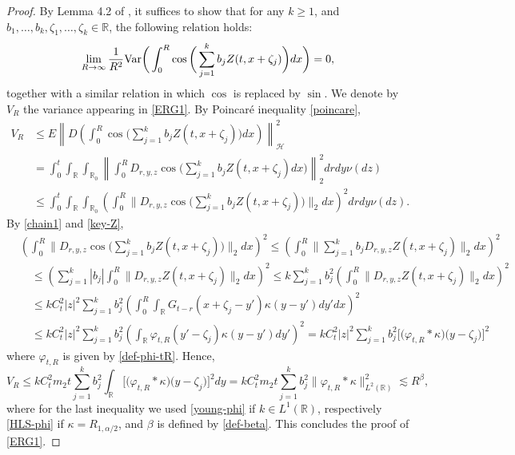 \documentclass[12pt]{article}
\def\cH{\mathcal{H}}
\def\bR{\mathbb{R}}
\newcommand{\les}{\lesssim}
\def\k{\kappa}
\begin{document}
\begin{proof} By Lemma 4.2 of \cite{BZ25}, it suffices to show that for any $k\geq 1$, and $b_1, \ldots , b_k, \zeta_1, \ldots, \zeta_k\in\bR$, the following relation holds:
\begin{align}
\label{ERG1}
\lim_{R\to\infty} \frac{1}{R^{2}}
{\rm Var}\bigg(  \int_0^R  \cos \bigg(\sum_{j=1}^k b_j  Z(t,x + \zeta_j)  \bigg) dx \bigg)
=0,
\end{align}
together with a similar relation in which $\cos$ is replaced by $\sin$. We denote by $V_R$ the variance appearing in \eqref{ERG1}. By Poincar\'e inequality \eqref{poincare}, 
\begin{align*}
V_R & \leq E \left\| D \left( \int_0^R  \cos \bigg(\sum_{j=1}^k b_j  Z(t,x + \zeta_j)  \bigg) dx \right) \right\|_{\cH}^2 \\
&= \int_0^t \int_{\bR} \int_{\bR_0} \left\|\int_0^R D_{r,y,z} \cos \bigg(\sum_{j=1}^k b_j  Z(t,x + \zeta_j) dx  \bigg) \right\|_2^2 drdy \nu(dz)\\
& \leq \int_0^t \int_{\bR} \int_{\bR_0} \left( \int_0^R \bigg\|D_{r,y,z} \cos \bigg(\sum_{j=1}^k b_j  Z(t,x + \zeta_j)\bigg) \bigg\|_2 dx  \right)^2 drdy \nu(dz).
\end{align*}
By \eqref{chain1} and \eqref{key-Z},
\begin{align*}
& \left(\int_0^R \bigg\|D_{r,y,z} \cos \bigg(\sum_{j=1}^k b_j  Z(t,x + \zeta_j)\bigg) \bigg\|_2 dx \right)^2 \leq
\left( \int_0^R  \bigg\|\sum_{j=1}^k b_j  D_{r,y,z} Z(t,x + \zeta_j) \bigg\|_2 dx \right)^2 \\
 & \quad \leq \left(\sum_{j=1}^k |b_j| \int_0^R \big\| D_{r,y,z} Z(t,x + \zeta_j) \big\|_2 dx\right)^2 \leq k \sum_{j=1}^k b_j^2 \left( \int_0^R \big\| D_{r,y,z} Z(t,x + \zeta_j) \big\|_2 dx\right)^2 \\
 & \quad \leq  k C_t^2 |z|^2 \sum_{j=1}^k b_j^2 \left( \int_0^R  \int_{\bR} G_{t-r}(x+\zeta_j-y') \k(y-y') dy' dx\right)^2 \\
 & \quad \leq  k C_t^2 |z|^2 \sum_{j=1}^k b_j^2 \left(  \int_{\bR} \varphi_{t,R}(y'-\zeta_j) \k(y-y') dy' \right)^2  = k C_t^2 |z|^2 \sum_{j=1}^k b_j^2 \big[\big(\varphi_{t,R}*\k)(y-\zeta_j\big)\big]^2
\end{align*}
where $\varphi_{t,R}$ is given by \eqref{def-phi-tR}. Hence, 
\[
V_R \leq  k C_t^2 m_2 t \sum_{j=1}^k b_j^2 \int_{\bR}\big[\big(\varphi_{t,R}*\k)(y-\zeta_j\big)\big]^2 dy=k C_t^2 m_2 t \sum_{j=1}^k b_j^2 \big\|\varphi_{t,R}*\k\big\|_{L^2(\bR)}^2 \les R^{\beta},
\]
where for the last inequality we used \eqref{young-phi} if  $k \in L^1(\bR)$, respectively \eqref{HLS-phi} if $\k=R_{1,\alpha/2}$, and $\beta$ is defined by \eqref{def-beta}. This concludes the proof of \eqref{ERG1}.

\end{proof}
\end{document}
